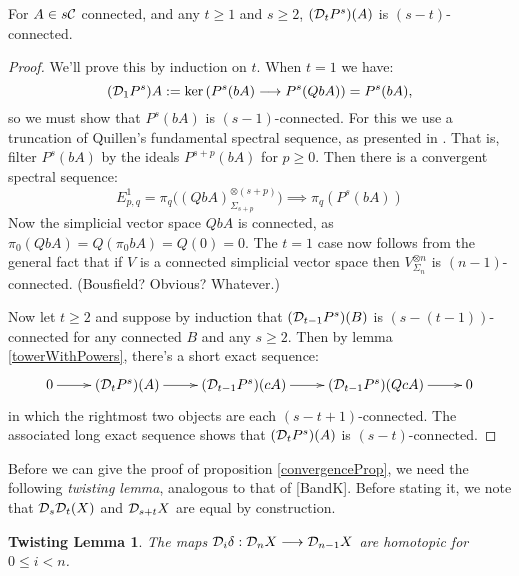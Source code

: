 \documentclass[11pt]{amsart}
\theoremstyle{plain}
\newtheorem{twistinglemma}[thm]{Twisting Lemma}
\newcommand{\Comm}{\calC}
\begin{document}
\begin{lem}\label{connectivityOfDerivedPowers}
For $A\in s\Comm$ connected, and any $t\geq1$ and $s\geq2$, $(\mathcal{D}_{\smash{t}}P^{s})(A)$ is $(s-t)$-connected.
\end{lem}
\begin{proof}
We'll prove this by induction on $t$. When $t=1$ we have:
\[(\mathcal{D}_{\smash{1}}P^{s})A:=\textup{ker}\,(P^{s}(bA)\longrightarrow P^{s}(QbA))=P^{s}(bA),\]
so we must show that $P^s(bA)$ is $(s-1)$-connected. For this we use a truncation of Quillen's fundamental spectral sequence, as presented in \cite[thm 6.2]{MR1089001}. That is, filter $P^s(bA)$ by the ideals $P^{s+p}(bA)$ for $p\geq0$. Then there is a convergent spectral sequence:
\[E^1_{p,q}= \pi_q\bigl((QbA)^{\otimes (s+p)}_{\Sigma_{s+p}}\bigr)\implies \pi_q(P^s(bA))\]
Now the simplicial vector space $QbA$ is connected, as $\pi_0(QbA)=Q(\pi_0bA)=Q(0)=0$. The $t=1$ case now follows from the general fact that if $V$ is a connected simplicial vector space then $V^{\otimes n}_{\Sigma_n}$ is $(n-1)$-connected. (Bousfield? Obvious? Whatever.)

Now let $t\geq2$ and suppose by induction that $(\mathcal{D}_{\smash{t-1}}P^{s})(B)$ is $(s-(t-1))$-connected for any connected $B$ and any $s\geq2$. Then by lemma \ref{towerWithPowers}, there's a short exact sequence:
\[\xymatrix{
0\ar[r]&
(\caldup{t}P^{s})(A)\ar[r]&
(\caldup{t-1}P^{s})(cA)\ar[r]&
(\caldup{t-1}P^{s})(QcA)\ar[r]&
0
}\]
in which the rightmost two objects are each $(s-t+1)$-connected. The associated long exact sequence shows that $(\mathcal{D}_{\smash{t}}P^{s})(A)$ is $(s-t)$-connected.
\end{proof}
Before we can give the proof of proposition \ref{convergenceProp}, we need the following \emph{twisting lemma}, analogous to that of [BandK]. Before stating it, we note that $\mathcal{D}_{\smash{s}}\mathcal{D}_{\smash{t}}(X)$ and $\mathcal{D}_{\smash{s+t}}X$ are equal by construction.
\begin{twistinglemma}
\label{DsDt=Dt+s}
The maps $\mathcal{D}_{\smash{i}}\delta:\mathcal{D}_{\smash{n}}X\longrightarrow \mathcal{D}_{\smash{n-1}}X$ are homotopic for $0\leq i< n$.
\end{twistinglemma}
\end{document}
